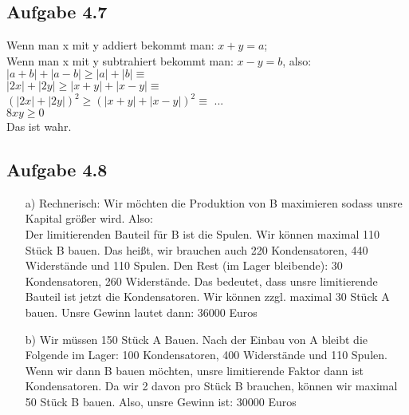 \documentclass{standalone}
\begin{document}
\subsection{Aufgabe 4.7}
Wenn man x mit y addiert bekommt man: $x+y=a$;\\
Wenn man x mit y subtrahiert bekommt man: $x-y=b$, also:\\
$|a+b|+|a-b| \ge |a|+|b| \equiv $\\
$|2x|+|2y| \ge |x+y|+|x-y| \equiv$\\
$(|2x|+|2y|)^2 \ge (|x+y|+|x-y|)^2 \equiv$ ... \\
$ 8xy \ge 0$\\
Das ist wahr.

\subsection{Aufgabe 4.8}
\begin{itemize}
	\item[a)] Rechnerisch: Wir möchten die Produktion von B maximieren sodass unsre Kapital größer wird. Also:\\
	
	Der limitierenden Bauteil für B ist die Spulen. Wir können maximal 110 Stück B bauen. Das heißt, wir brauchen auch 220 Kondensatoren, 440 Widerstände und 110 Spulen. Den Rest (im Lager bleibende): 30 Kondensatoren, 260 Widerstände. Das bedeutet, dass unsre limitierende Bauteil ist jetzt die Kondensatoren. Wir können zzgl. maximal 30 Stück A bauen. Unsre Gewinn lautet dann: 36000 Euros \\ 
	\item[b)] Wir müssen 150 Stück A Bauen. Nach der Einbau von A bleibt die Folgende im Lager: 100 Kondensatoren, 400 Widerstände und 110 Spulen. Wenn wir dann B bauen möchten, unsre limitierende Faktor dann ist Kondensatoren. Da wir 2 davon pro Stück B brauchen, können wir maximal 50 Stück B bauen. Also, unsre Gewinn ist: 30000 Euros\\
\end{itemize}
\end{document}
